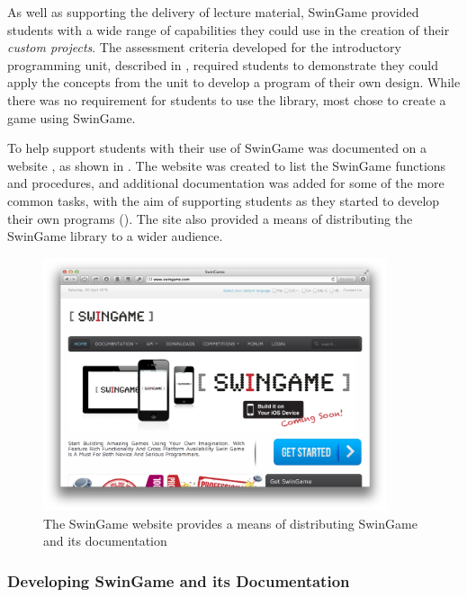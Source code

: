 As well as supporting the delivery of lecture material, SwinGame provided students with a wide range of capabilities they could use in the creation of their \emph{custom projects}. The assessment criteria developed for the introductory programming unit, described in , required students to demonstrate they could apply the concepts from the unit to develop a program of their own design. While there was no requirement for students to use the library, most chose to create a game using SwinGame.

To help support students with their use of SwinGame was documented on a website \cite{swingame}, as shown in . The website was created to list the SwinGame functions and procedures, and additional documentation was added for some of the more common tasks, with the aim of supporting students as they started to develop their own programs (). The site also provided a means of distributing the SwinGame library to a wider audience.  

\begin{figure}[thbp]
  \centering
  \includegraphics[width=0.9\textwidth]{SwinGame}
  \caption{The SwinGame website provides a means of distributing SwinGame and its documentation}
  \label{fig:website}
\end{figure}


\subsubsection{Developing SwinGame and its Documentation} %
\label{sub:developing_swingame_and_its_documentation}


